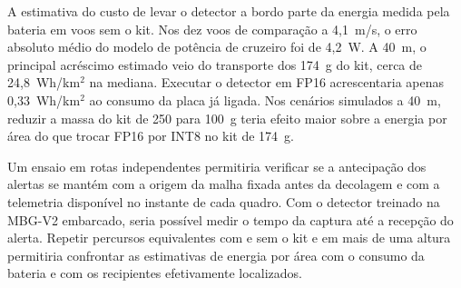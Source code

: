 A estimativa do custo de levar o detector a bordo parte da energia medida pela bateria em voos sem o kit. Nos dez voos de comparação a 4,1~m/s, o erro absoluto médio do modelo de potência de cruzeiro foi de 4,2~W. A 40~m, o principal acréscimo estimado veio do transporte dos 174~g do kit, cerca de 24,8~Wh/km$^2$ na mediana. Executar o detector em FP16 acrescentaria apenas 0,33~Wh/km$^2$ ao consumo da placa já ligada. Nos cenários simulados a 40~m, reduzir a massa do kit de 250 para 100~g teria efeito maior sobre a energia por área do que trocar FP16 por INT8 no kit de 174~g.

Um ensaio em rotas independentes permitiria verificar se a antecipação dos alertas se mantém com a origem da malha fixada antes da decolagem e com a telemetria disponível no instante de cada quadro. Com o detector treinado na MBG-V2 embarcado, seria possível medir o tempo da captura até a recepção do alerta. Repetir percursos equivalentes com e sem o kit e em mais de uma altura permitiria confrontar as estimativas de energia por área com o consumo da bateria e com os recipientes efetivamente localizados.
